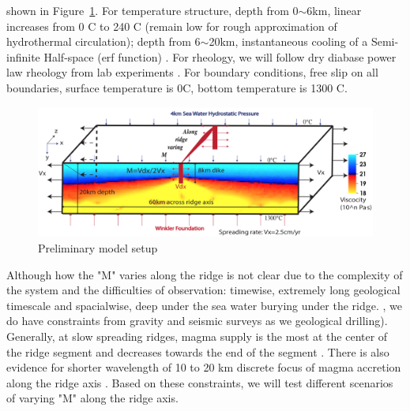 \documentclass[12pt]{article}
\begin{document}
 shown in Figure~\ref{fig8_1}. For temperature structure, depth from 0$\sim$6km, linear increases from 0 \degree C to 240 \degree C (remain low for rough approximation of hydrothermal circulation); depth from 6$\sim$20km, instantaneous cooling of a Semi-infinite Half-space (erf function) \citep{Turcotte2002}. For rheology, we will follow dry diabase power law rheology from lab experiments \citep{Kirby1987}. For boundary conditions, free slip on all boundaries, surface temperature is 0\degree C, bottom temperature is 1300 \degree C.

\begin{figure}[H]
 \centering
  \includegraphics[scale=0.5]{fig8_1.png}
 \caption{\small Preliminary model setup}
 \label{fig8_1}
\end{figure}


Although how the "M" varies along the ridge is not clear due to the complexity of the system and the difficulties of observation: timewise, extremely long geological timescale and spacialwise, deep under the sea water burying under the ridge. , we do have constraints from  gravity and seismic surveys as we geological drilling). Generally, at slow spreading ridges, magma supply is the most at the center of the ridge segment and decreases towards the end of the segment \citep{Tolstoy1993,Chen1999}. There is also evidence for shorter wavelength of 10 to 20 km discrete focus of magma accretion along the ridge axis \citep{Lin1990}. Based on these constraints, we will test different scenarios of varying "M" along the ridge axis.


\break
\end{document}

